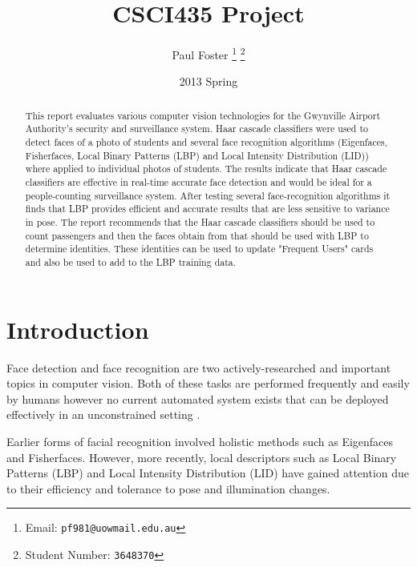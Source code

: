 \documentclass{article}
\begin{document}
\title{CSCI435 Project}
\author{Paul Foster
	\thanks{Email: \texttt{pf981@uowmail.edu.au}}
	\thanks{Student Number: \texttt{3648370}}}
\date{2013 Spring}

\maketitle

\renewcommand\abstractname{Executive Summary}
\begin{abstract}
This report evaluates various computer vision technologies for the Gwynville Airport Authority's security and surveillance system. Haar cascade classifiers were used to detect faces of a photo of students and several face recognition algorithms (Eigenfaces, Fisherfaces, Local Binary Patterns (LBP) and Local Intensity Distribution (LID)) where applied to individual photos of students. The results indicate that Haar cascade classifiers are effective in real-time accurate face detection and would be ideal for a people-counting surveillance system. After testing several face-recognition algorithms it finds that LBP provides efficient and accurate results that are less sensitive to variance in pose. The report recommends that the Haar cascade classifiers should be used to count passengers and then the faces obtain from that should be used with LBP to determine identities. These identities can be used to update "Frequent Users" cards and also be used to add to the LBP training data.
\end{abstract}

\section{Introduction}
Face detection and face recognition are two actively-researched and important topics in computer vision. Both of these tasks are performed frequently and easily by humans however no current automated system exists that can be deployed effectively in an unconstrained setting \cite{sinha2006face}.

Earlier forms of facial recognition involved holistic methods such as Eigenfaces\cite{turk1991eigenfaces} and Fisherfaces\cite{belhumeur1997eigenfaces}. However, more recently, local descriptors such as Local Binary Patterns (LBP)\cite{ahonen2004face} and Local Intensity Distribution (LID)\cite{nguyen2011local} have gained attention due to their efficiency and tolerance to pose and illumination changes.
\end{document}
